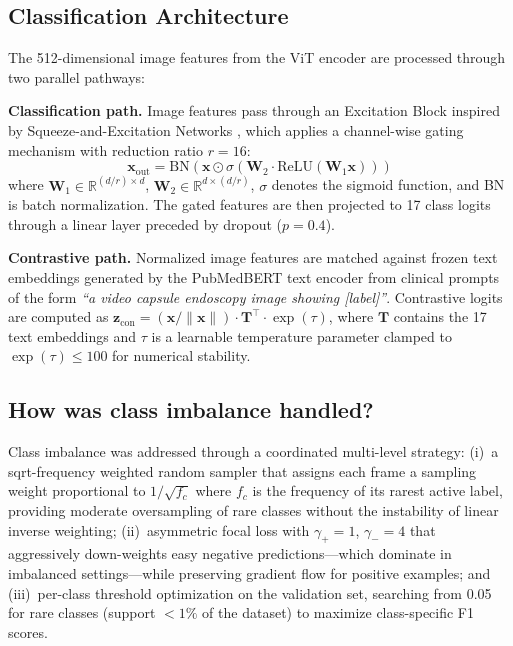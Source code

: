 \documentclass[12pt]{article}
\begin{document}
\subsection{Classification Architecture}

The 512-dimensional image features from the ViT encoder are processed through two parallel pathways:

\textbf{Classification path.} Image features pass through an Excitation Block inspired by Squeeze-and-Excitation Networks \cite{Hu2018senet}, which applies a channel-wise gating mechanism with reduction ratio $r=16$:
\begin{equation}
    \mathbf{x}_{\text{out}} = \text{BN}\left(\mathbf{x} \odot \sigma\left(\mathbf{W}_2 \cdot \text{ReLU}\left(\mathbf{W}_1 \mathbf{x}\right)\right)\right)
\end{equation}
where $\mathbf{W}_1 \in \mathbb{R}^{(d/r) \times d}$, $\mathbf{W}_2 \in \mathbb{R}^{d \times (d/r)}$, $\sigma$ denotes the sigmoid function, and BN is batch normalization. The gated features are then projected to 17 class logits through a linear layer preceded by dropout ($p=0.4$).

\textbf{Contrastive path.} Normalized image features are matched against frozen text embeddings generated by the PubMedBERT text encoder from clinical prompts of the form \textit{``a video capsule endoscopy image showing [label]''}. Contrastive logits are computed as $\mathbf{z}_{\text{con}} = (\mathbf{x} / \|\mathbf{x}\|) \cdot \mathbf{T}^\top \cdot \exp(\tau)$, where $\mathbf{T}$ contains the 17 text embeddings and $\tau$ is a learnable temperature parameter clamped to $\exp(\tau) \leq 100$ for numerical stability.

\subsection{How was class imbalance handled?}

Class imbalance was addressed through a coordinated multi-level strategy: (i)~a sqrt-frequency weighted random sampler that assigns each frame a sampling weight proportional to $1/\sqrt{f_c}$ where $f_c$ is the frequency of its rarest active label, providing moderate oversampling of rare classes without the instability of linear inverse weighting; (ii)~asymmetric focal loss \cite{Ridnik2021asl} with $\gamma_+ = 1$, $\gamma_- = 4$ that aggressively down-weights easy negative predictions—which dominate in imbalanced settings—while preserving gradient flow for positive examples; and (iii)~per-class threshold optimization on the validation set, searching from 0.05 for rare classes (support $< 1\%$ of the dataset) to maximize class-specific F1 scores.
\end{document}
